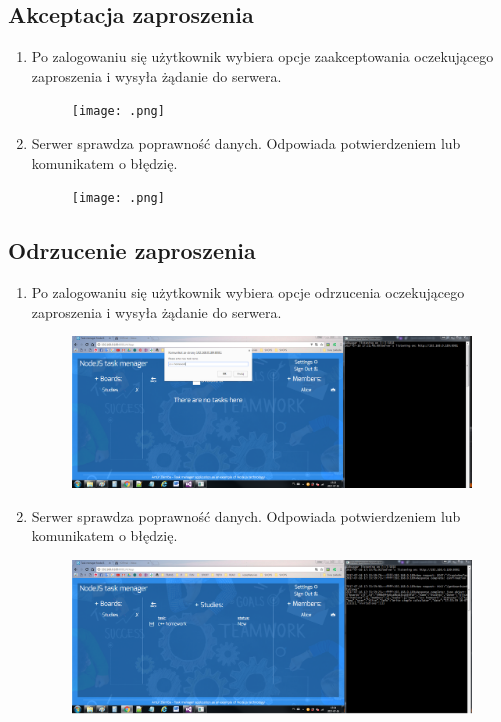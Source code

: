 \documentclass[12pt]{report}
\begin{document}
\begin{enumerate}
\begin{enumerate}
\begin{enumerate}
\subsection{Akceptacja zaproszenia}
\begin{enumerate}
\item Po zalogowaniu się użytkownik wybiera opcje zaakceptowania oczekującego zaproszenia i wysyła żądanie do serwera.
\begin{figure}[!t]
\centering
\texttt{[image: .png]}
\end{figure}
\item Serwer sprawdza poprawność danych. Odpowiada potwierdzeniem lub komunikatem o błędzię.
\begin{figure}[!t]
\centering
\texttt{[image: .png]}
\end{figure}
\end{enumerate}

\subsection{Odrzucenie zaproszenia}
\begin{enumerate}
\item Po zalogowaniu się użytkownik wybiera opcje odrzucenia oczekującego zaproszenia i wysyła żądanie do serwera.
\begin{figure}[!t]
\centering
\includegraphics{A1.png}
\end{figure}
\item Serwer sprawdza poprawność danych. Odpowiada potwierdzeniem lub komunikatem o błędzię.
\begin{figure}[!t]
\centering
\includegraphics{A2.png}
\end{figure}
\end{enumerate}


\end{enumerate}
\end{enumerate}
\end{enumerate}
\end{document}
